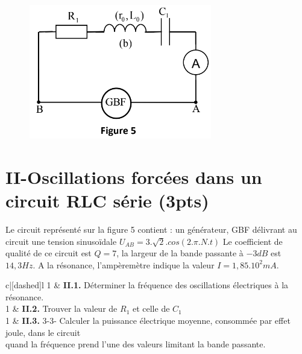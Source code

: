 \documentclass[12pt]{article}
\begin{document}
\begin{figure}
\includegraphics[width=0.9\linewidth]{./img/phys05.png} 
\end{figure}


\section*{II-Oscillations forcées dans un circuit RLC série (3pts)}
Le circuit représenté sur la figure 5 contient : un générateur, GBF délivrant au circuit une tension sinusoïdale $U_{AB} = 3.\sqrt{2}.cos(2.\pi.N.t)$
Le coefficient de qualité de ce circuit est $Q = 7$, la largeur de la bande passante à $-3dB$ est $14,3Hz$.
A la résonance, l’ampèremètre indique la valeur $I = 1,85.10^2 mA$.

\begin{tblr}{c|[dashed]l}
1  & \textbf{II.1. }Déterminer la fréquence des oscillations électriques à la résonance.\\
1 & \textbf{II.2. }Trouver la valeur de $R_1$ et celle de $C_1$\\
	1 & {\textbf{II.3. }3-3- Calculer la puissance électrique moyenne, consommée par effet joule, dans le circuit \\quand la fréquence prend l’une des valeurs limitant la bande passante.}\\ 

\end{tblr}
\end{document}
